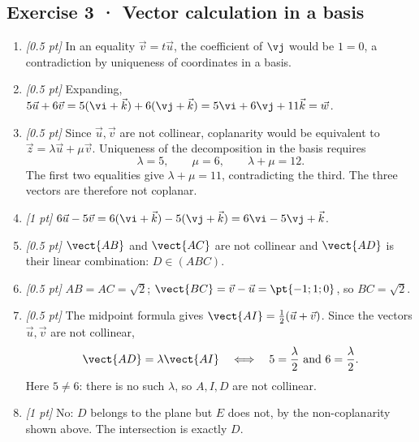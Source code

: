 \subsection*{Exercise 3 · Vector calculation in a basis}\begin{enumerate}

\item \textit{[0.5 pt]} In an equality $\vec v=t\vec u$, the coefficient of $\vj $ would be $1=0$, a contradiction by uniqueness of coordinates in a basis.

\item \textit{[0.5 pt]} Expanding, $5\vec u+6\vec v=5(\vi +\vec k)+6(\vj +\vec k)=5\vi +6\vj +11\vec k=\vec w$.

\item \textit{[0.5 pt]} Since $\vec u,\vec v$ are not collinear, coplanarity would be equivalent to $\vec z=\lambda\vec u+\mu\vec v$. Uniqueness of the decomposition in the basis requires
\[\lambda=5,\qquad\mu=6,\qquad\lambda+\mu=12.\]
The first two equalities give $\lambda+\mu=11$, contradicting the third. The three vectors are therefore not coplanar.

\item \textit{[1 pt]} $6\vec u-5\vec v=6(\vi +\vec k)-5(\vj +\vec k)=6\vi -5\vj +\vec k$.

\item \textit{[0.5 pt]} $\vect{AB}$ and $\vect{AC}$ are not collinear and $\vect{AD}$ is their linear combination: $D\in(ABC)$.

\item \textit{[0.5 pt]} $AB=AC=\sqrt2$; $\vect{BC}=\vec v-\vec u=\pt{-1;1;0}$, so $BC=\sqrt2$.

\item \textit{[0.5 pt]} The midpoint formula gives $\vect{AI}=\frac12(\vec u+\vec v)$. Since the vectors $\vec u,\vec v$ are not collinear,
\[\vect{AD}=\lambda\vect{AI}\quad\Longleftrightarrow\quad 5=\frac{\lambda}{2}\ \text{and}\ 6=\frac{\lambda}{2}.\]
Here $5\ne 6$: there is no such $\lambda$, so $A,I,D$ are not collinear.

\item \textit{[1 pt]} No: $D$ belongs to the plane but $E$ does not, by the non-coplanarity shown above. The intersection is exactly $D$.

\end{enumerate}


